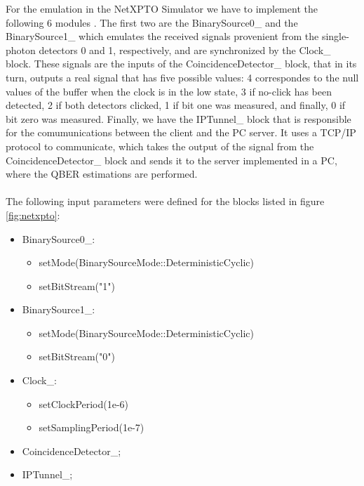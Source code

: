 \begin{refsection}
	For the emulation in the NetXPTO Simulator we have to implement the following 6 modules . The first two are the BinarySource0\_ and the BinarySource1\_ which emulates the received signals provenient from the single-photon detectors 0 and 1, respectively, and are synchronized by the Clock\_ block. These signals are the inputs of the CoincidenceDetector\_ block, that in its turn, outputs a real signal that has five possible values: 4 correspondes to the null values of the buffer when the clock is in the low state, 3 if no-click has been detected, 2 if both detectors clicked, 1 if bit one was measured, and finally, 0 if bit zero was measured. Finally, we have the IPTunnel\_ block that is responsible for the comumunications between the client and the PC server. It uses a TCP/IP protocol to communicate, which takes the output of the signal from the CoincidenceDetector\_ block and sends it to the server implemented in a PC, where the QBER estimations are performed. \\ \\

	
	The following input parameters were defined for the blocks listed in figure \ref{fig:netxpto}:
	
	\begin{itemize}
		\item BinarySource0\_:
		\begin{itemize}
			\item setMode(BinarySourceMode::DeterministicCyclic)
			\item setBitStream("1")
		\end{itemize}
		\clearpage
		\item BinarySource1\_:
		\begin{itemize}
			\item setMode(BinarySourceMode::DeterministicCyclic)
			\item setBitStream("0")
		\end{itemize}
		
		\item Clock\_:
		\begin{itemize}
			\item setClockPeriod(1e-6)
			\item setSamplingPeriod(1e-7)
		\end{itemize}
		
		\item CoincidenceDetector\_;
		
		\item IPTunnel\_;
		


\end{itemize}
\end{refsection}
